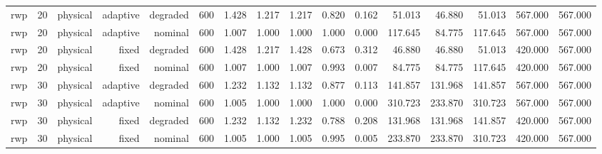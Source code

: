 \begin{tabular}{lrrrrrrrrrrrrrrr}
rwp & 20 & physical & adaptive & degraded & 600 & 1.428 & 1.217 & 1.217 & 0.820 & 0.162 & 51.013 & 46.880 & 51.013 & 567.000 & 567.000 \\
rwp & 20 & physical & adaptive & nominal & 600 & 1.007 & 1.000 & 1.000 & 1.000 & 0.000 & 117.645 & 84.775 & 117.645 & 567.000 & 567.000 \\
rwp & 20 & physical & fixed & degraded & 600 & 1.428 & 1.217 & 1.428 & 0.673 & 0.312 & 46.880 & 46.880 & 51.013 & 420.000 & 567.000 \\
rwp & 20 & physical & fixed & nominal & 600 & 1.007 & 1.000 & 1.007 & 0.993 & 0.007 & 84.775 & 84.775 & 117.645 & 420.000 & 567.000 \\
rwp & 30 & physical & adaptive & degraded & 600 & 1.232 & 1.132 & 1.132 & 0.877 & 0.113 & 141.857 & 131.968 & 141.857 & 567.000 & 567.000 \\
rwp & 30 & physical & adaptive & nominal & 600 & 1.005 & 1.000 & 1.000 & 1.000 & 0.000 & 310.723 & 233.870 & 310.723 & 567.000 & 567.000 \\
rwp & 30 & physical & fixed & degraded & 600 & 1.232 & 1.132 & 1.232 & 0.788 & 0.208 & 131.968 & 131.968 & 141.857 & 420.000 & 567.000 \\
rwp & 30 & physical & fixed & nominal & 600 & 1.005 & 1.000 & 1.005 & 0.995 & 0.005 & 233.870 & 233.870 & 310.723 & 420.000 & 567.000 \\
\bottomrule
\end{tabular}